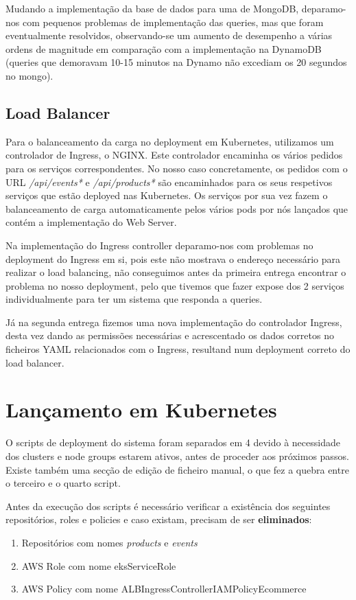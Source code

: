 \documentclass[11pt,a4paper]{article}
\begin{document}
Mudando a implementação da base de dados para uma de MongoDB, deparamo-nos com pequenos problemas de implementação das queries, mas que foram eventualmente resolvidos, observando-se um aumento de desempenho a várias ordens de magnitude em comparação com a implementação na DynamoDB (queries que demoravam 10-15 minutos na Dynamo não excediam os 20 segundos no mongo).

\subsection{Load Balancer}
Para o balanceamento da carga no deployment em Kubernetes, utilizamos um controlador de Ingress, o NGINX. Este controlador encaminha os vários pedidos para os serviços correspondentes. No nosso caso concretamente, os pedidos com o URL \textit{/api/events*} e \textit{/api/products*} são encaminhados para os seus respetivos serviços que estão deployed nas Kubernetes. Os serviços por sua vez fazem o balanceamento de carga automaticamente pelos vários pods por nós lançados que contém a implementação do Web Server.

Na implementação do Ingress controller deparamo-nos com problemas no deployment do Ingress em si, pois este não mostrava o endereço necessário para realizar o load balancing, não conseguimos antes da primeira entrega encontrar o problema no nosso deployment, pelo que tivemos que fazer expose dos 2 serviços individualmente para ter um sistema que responda a queries.

Já na segunda entrega fizemos uma nova implementação do controlador Ingress, desta vez dando as permissões necessárias e acrescentado os dados corretos no ficheiros YAML relacionados com o Ingress, resultand num deployment correto do load balancer.
\section{Lançamento em Kubernetes}
O scripts de deployment do sistema foram separados em 4 devido à necessidade dos clusters e node groups estarem ativos, antes de proceder aos próximos passos. Existe também uma secção de edição de ficheiro manual, o que fez a quebra entre o terceiro e o quarto script.

Antes da execução dos scripts é necessário verificar a existência dos seguintes repositórios, roles e policies e caso existam, precisam de ser \textbf{eliminados}:
\begin{enumerate}
	\item Repositórios com nomes \textit{products} e \textit{events}
	\item AWS Role com nome eksServiceRole
	\item AWS Policy com nome ALBIngressControllerIAMPolicyEcommerce
\end{enumerate}
\end{document}
